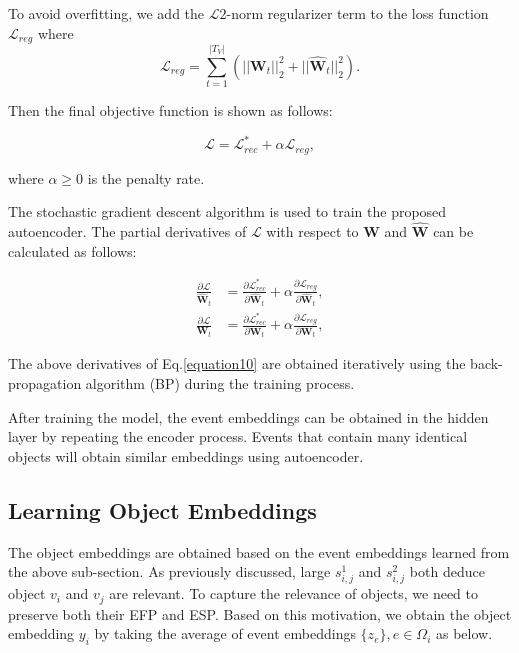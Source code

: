 \smallskip
To avoid overfitting, we add the $\mathcal{L}2$-norm regularizer term to the loss function $\mathcal{L}_{reg}$ where \\
\begin{equation}\label{equation8}
\mathcal{L}_{reg} = \sum_{t=1}^{|T_V|} (||\textbf{W}_t||_2^2 + ||\hat{\textbf{W}}_t||_2^2).
\end{equation}

\noindent Then the final objective function is shown as follows:

\begin{equation}\label{equation9}
\mathcal{L} = \mathcal{L}_{rec}^* + \alpha\mathcal{L}_{reg},
\end{equation}

\noindent where $\alpha \ge 0$ is the penalty rate.
\smallskip

The stochastic gradient descent algorithm is used to train the proposed autoencoder. The partial derivatives of $\mathcal{L}$ with respect to $\textbf{W}$ and $\hat{\textbf{W}}$ can be calculated as follows:

\begin{equation}\label{equation10}
\begin{aligned}
\frac{\partial \mathcal{L}}{\hat{\textbf{W}}_t} &= \frac{\partial \mathcal{L}_{rec}^*}{\partial \hat{\textbf{W}}_t} + \alpha\frac{\partial \mathcal{L}_{reg}}{\partial \hat{\textbf{W}}_t}, \\
\frac{\partial \mathcal{L}}{\textbf{W}_t} &= \frac{\partial \mathcal{L}_{rec}^*}{\partial \textbf{W}_t} + \alpha\frac{\partial \mathcal{L}_{reg}}{\partial \textbf{W}_t},
\end{aligned}
\end{equation}
\smallskip

The above derivatives of Eq.\ref{equation10} are obtained iteratively using the back-propagation algorithm (BP) \cite{lecun2015deep} during the training process.
\smallskip

After training the model, the event embeddings can be obtained in the hidden layer by repeating the encoder process. Events that contain many identical objects will obtain similar embeddings using autoencoder.


\subsection{Learning Object Embeddings}
The object embeddings are obtained based on the event embeddings learned from the above sub-section. As previously discussed, large $s_{i,j}^1$ and $s_{i,j}^2$ both deduce object $v_i$ and $v_j$ are relevant. To capture the relevance of objects, we need to preserve both their EFP and ESP. Based on this motivation, we obtain the object embedding $y_i$ by taking the average of event embeddings $\{z_e\}, e\in \Omega_i$ as below.

